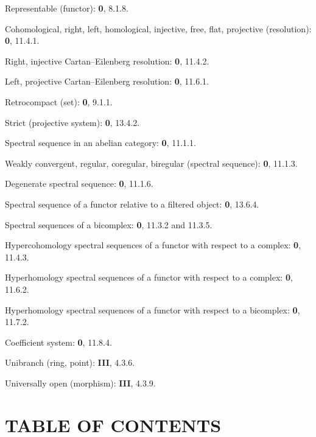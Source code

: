 \begin{flushleft}
Representable (functor): \textbf{0}, 8.1.8.

Cohomological, right, left, homological, injective, free, flat, projective
(resolution): \textbf{0}, 11.4.1.

Right, injective Cartan--Eilenberg resolution: \textbf{0}, 11.4.2.

Left, projective Cartan--Eilenberg resolution: \textbf{0}, 11.6.1.

Retrocompact (set): \textbf{0}, 9.1.1.

Strict (projective system): \textbf{0}, 13.4.2.

Spectral sequence in an abelian category: \textbf{0}, 11.1.1.

Weakly convergent, regular, coregular, biregular (spectral sequence):
\textbf{0}, 11.1.3.

Degenerate spectral sequence: \textbf{0}, 11.1.6.

Spectral sequence of a functor relative to a filtered object: \textbf{0}, 13.6.4.

Spectral sequences of a bicomplex: \textbf{0}, 11.3.2 and 11.3.5.

Hypercohomology spectral sequences of a functor with respect to a complex:
\textbf{0}, 11.4.3.

Hyperhomology spectral sequences of a functor with respect to a complex:
\textbf{0}, 11.6.2.

Hyperhomology spectral sequences of a functor with respect to a bicomplex:
\textbf{0}, 11.7.2.

Coefficient system: \textbf{0}, 11.8.4.

Unibranch (ring, point): \textbf{III}, 4.3.6.

Universally open (morphism): \textbf{III}, 4.3.9.
\end{flushleft}

\clearpage
{}
\section*{TABLE OF CONTENTS}

